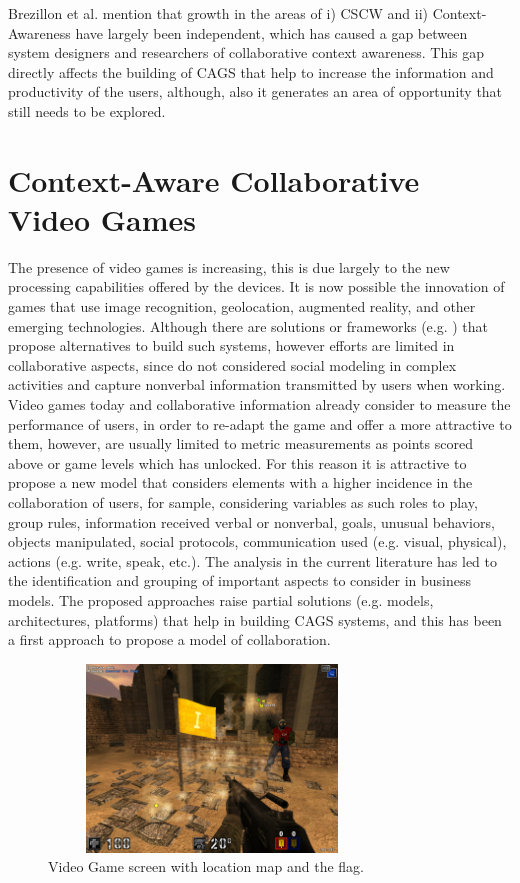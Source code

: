 \documentclass[conference]{./sty/IEEEtran}
\begin{document}
Brezillon et al. \cite{Brezillon08} mention that growth in the areas of i) CSCW and ii) Context-Awareness have largely been independent, which has caused a gap between system designers and researchers of collaborative context awareness. This gap directly affects the building of CAGS that help to increase the information and productivity of the users, although, also it generates an area of opportunity that still needs to be explored.


\section{Context-Aware Collaborative Video Games} %
\label{sec:videogame}
The presence of video games is increasing, this is due largely to the new processing capabilities offered by the devices. It is now possible the innovation of games that use image recognition, geolocation, augmented reality, and other emerging technologies. Although there are solutions or frameworks (e.g. \cite{Diamantaki10,Zea09,Marty11}) that propose alternatives to build such systems, however efforts are limited in collaborative aspects, since do not considered social modeling in complex activities and capture nonverbal information transmitted by users when working. Video games today and collaborative information already consider to measure the performance of users, in order to re-adapt the game and offer a more attractive to them, however, are usually limited to metric measurements as points scored above or game levels which has unlocked. For this reason it is attractive to propose a new model that considers elements with a higher incidence in the collaboration of users, for sample,  considering variables as such roles to play, group rules, information received verbal or nonverbal, goals, unusual behaviors, objects manipulated, social protocols, communication used (e.g. visual, physical), actions (e.g. write, speak, etc.). The analysis in the current literature has led to the identification and grouping of important aspects to consider in business models. The proposed approaches raise partial solutions (e.g. models, architectures, platforms) that help in building CAGS systems, and this has been a first approach to propose a model of collaboration.


\begin{figure}[ht!]
	\centering
			\includegraphics[width=8.7cm,height=5cm]{images/juego.jpg}
	\caption{Video Game screen with location map and the flag.}
	\label{fig:juego}
\end{figure}
\end{document}
